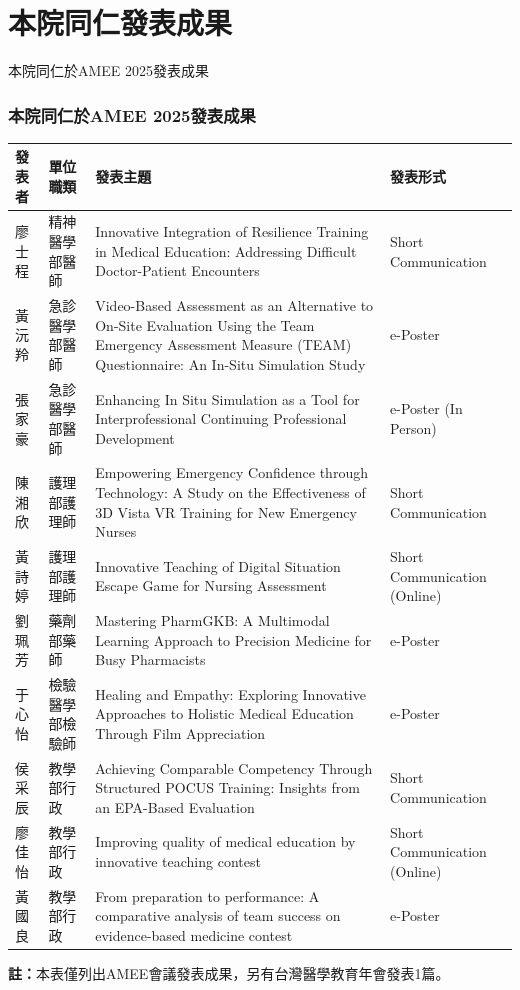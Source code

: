 \documentclass[aspectratio=169]{beamer}
\begin{document}
\section{本院同仁發表成果}

\begin{frame}{本院同仁於AMEE 2025發表成果}
\frametitle{本院同仁於AMEE 2025發表成果}
\vspace{-0.3cm}

\begin{table}[h]
\centering
\fontsize{6pt}{7.5pt}\selectfont
\begin{tabular}{p{1.3cm}p{1.8cm}p{5.2cm}p{2.2cm}}
\toprule
\textbf{發表者} & \textbf{單位職類} & \textbf{發表主題} & \textbf{發表形式} \\
\midrule
廖士程 & 精神醫學部醫師 & Innovative Integration of Resilience Training in Medical Education: Addressing Difficult Doctor-Patient Encounters & Short Communication \\
\midrule
黃沅羚 & 急診醫學部醫師 & Video-Based Assessment as an Alternative to On-Site Evaluation Using the Team Emergency Assessment Measure (TEAM) Questionnaire: An In-Situ Simulation Study & e-Poster \\
\midrule
張家豪 & 急診醫學部醫師 & Enhancing In Situ Simulation as a Tool for Interprofessional Continuing Professional Development & e-Poster (In Person) \\
\midrule
陳湘欣 & 護理部護理師 & Empowering Emergency Confidence through Technology: A Study on the Effectiveness of 3D Vista VR Training for New Emergency Nurses & Short Communication \\
\midrule
黃詩婷 & 護理部護理師 & Innovative Teaching of Digital Situation Escape Game for Nursing Assessment & Short Communication (Online) \\
\midrule
劉珮芳 & 藥劑部藥師 & Mastering PharmGKB: A Multimodal Learning Approach to Precision Medicine for Busy Pharmacists & e-Poster \\
\midrule
于心怡 & 檢驗醫學部檢驗師 & Healing and Empathy: Exploring Innovative Approaches to Holistic Medical Education Through Film Appreciation & e-Poster \\
\midrule
侯采辰 & 教學部行政 & Achieving Comparable Competency Through Structured POCUS Training: Insights from an EPA-Based Evaluation & Short Communication \\
\midrule
廖佳怡 & 教學部行政 & Improving quality of medical education by innovative teaching contest & Short Communication (Online) \\
\midrule
黃國良 & 教學部行政 & From preparation to performance: A comparative analysis of team success on evidence-based medicine contest & e-Poster \\
\bottomrule
\end{tabular}
\end{table}
\vspace{0.2cm}
\textbf{註：}本表僅列出AMEE會議發表成果，另有台灣醫學教育年會發表1篇。
\end{frame}
\end{document}
